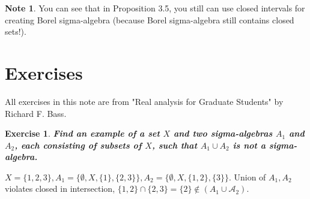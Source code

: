 \documentclass[11pt,a4paper]{article}
\theoremstyle{definition}
\newtheorem{exercise}[definition]{Exercise}
\newtheorem{note}[definition]{Note}
\theoremstyle{plain}
\newcommand{\A}{\mathcal{A}}
\begin{document}
\begin{note}
You can see that in Proposition 3.5, you still can use closed intervals for creating Borel sigma-algebra (because Borel sigma-algebra still contains closed sets!).
\end{note}

\section{Exercises}

All exercises in this note are from "Real analysis for Graduate Students" by Richard F. Bass.

\begin{exercise}
\textit{\textbf{Find an example of a set $X$ and two sigma-algebras $A_1$ and $A_2$, each consisting of subsets of $X$, such that $A_1 \cup A_2$ is not a sigma-algebra.}}

$X = \{1,2,3\}, A_1=\{\emptyset, X, \{1\}, \{2,3\}\}, A_2=\{\emptyset, X, \{1,2\}, \{3\}\}$.
Union of $A_1, A_2$ violates closed in intersection, $\{1,2\} \cap \{2,3\} = \{2\}\not\in (A_1\cup \A_2)$.
\end{exercise}
\end{document}
